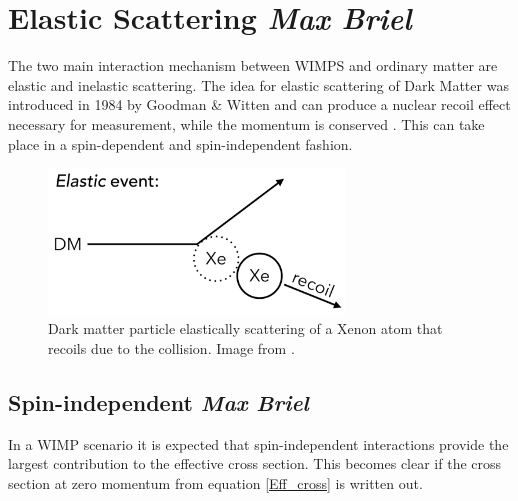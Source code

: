 \documentclass{article}
\begin{document}
% 

\FloatBarrier
\section{Elastic Scattering \small{\textit{Max Briel}}}

The two main interaction mechanism between WIMPS and ordinary matter are elastic and inelastic scattering. The idea for elastic scattering of Dark Matter was introduced in 1984 by Goodman \& Witten \cite{Goodman:1984dc} and can produce a nuclear recoil effect necessary for measurement, while the momentum is conserved \cite{Undagoitia:2015gya, Lewin:1995rx}. This can take place in a spin-dependent and spin-independent fashion. 

\begin{figure}[h]
    \centering
    \includegraphics[width=0.7\textwidth]{Elastic_Scattering.png}
    \caption{Dark matter particle elastically scattering of a Xenon atom that recoils due to the collision. Image from \cite{McCabe:2015eia}.}
    \label{elastic}
\end{figure}


\subsection{Spin-independent \small{\textit{Max Briel}}} 

In a WIMP scenario it is expected that spin-independent interactions provide the largest contribution to the effective cross section. This becomes clear if the cross section at zero momentum from equation \ref{Eff_cross} is written out. 
\end{document}
